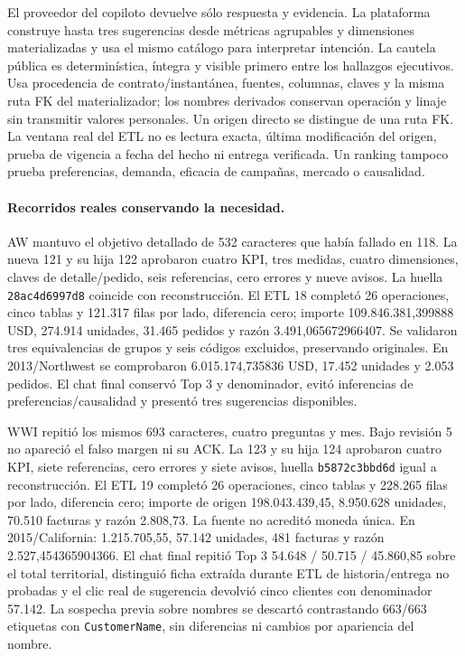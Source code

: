 \documentclass[11pt,letterpaper]{article}
\newcommand{\file}[1]{\texttt{#1}}
\begin{document}
El proveedor del copiloto devuelve sólo respuesta y evidencia. La plataforma
construye hasta tres sugerencias desde métricas agrupables y dimensiones
materializadas y usa el mismo catálogo para interpretar intención. La cautela
pública es determinística, íntegra y visible primero entre los hallazgos ejecutivos.
Usa procedencia de contrato/instantánea, fuentes, columnas, claves y la misma ruta
FK del materializador; los nombres derivados conservan operación y linaje sin
transmitir valores personales. Un origen directo se distingue de una ruta FK.
La ventana real del ETL no es lectura exacta, última modificación del origen,
prueba de vigencia a fecha del hecho ni entrega verificada. Un ranking tampoco
prueba preferencias, demanda, eficacia de campañas, mercado o causalidad.

\paragraph{Recorridos reales conservando la necesidad.}
AW mantuvo el objetivo detallado de 532 caracteres que había fallado en 118.
La nueva 121 y su hija 122 aprobaron cuatro KPI, tres medidas, cuatro dimensiones,
claves de detalle/pedido, seis referencias, cero errores y nueve avisos. La huella
\file{28ac4d6997d8} coincide con reconstrucción. El ETL 18 completó 26 operaciones,
cinco tablas y 121.317 filas por lado, diferencia cero; importe
109.846.381,399888 USD, 274.914 unidades, 31.465 pedidos y razón 3.491,065672966407.
Se validaron tres equivalencias de grupos y seis códigos excluidos, preservando
originales. En 2013/Northwest se comprobaron 6.015.174,735836 USD, 17.452 unidades
y 2.053 pedidos. El chat final conservó Top 3 y denominador, evitó inferencias de
preferencias/causalidad y presentó tres sugerencias disponibles.

WWI repitió los mismos 693 caracteres, cuatro preguntas y mes. Bajo revisión 5
no apareció el falso margen ni su ACK. La 123 y su hija 124 aprobaron cuatro KPI,
siete referencias, cero errores y siete avisos, huella \file{b5872c3bbd6d} igual
a reconstrucción. El ETL 19 completó 26 operaciones, cinco tablas y 228.265 filas
por lado, diferencia cero; importe de origen 198.043.439,45, 8.950.628 unidades,
70.510 facturas y razón 2.808,73. La fuente no acreditó moneda única. En
2015/California: 1.215.705,55, 57.142 unidades, 481 facturas y razón
2.527,454365904366. El chat final repitió Top 3 54.648 / 50.715 / 45.860,85 sobre
el total territorial, distinguió ficha extraída durante ETL de historia/entrega
no probadas y el clic real de sugerencia devolvió cinco clientes con denominador
57.142. La sospecha previa sobre nombres se descartó contrastando 663/663 etiquetas
con \file{CustomerName}, sin diferencias ni cambios por apariencia del nombre.
\end{document}
